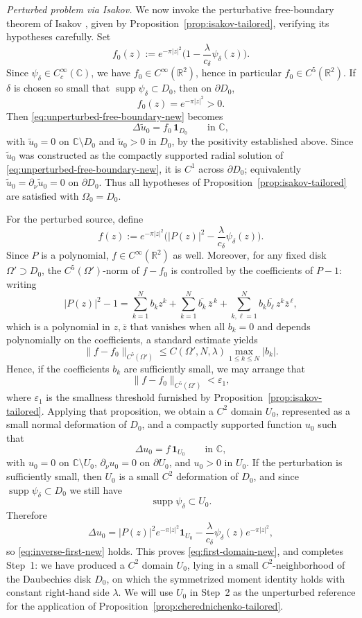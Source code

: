 \documentclass[a4paper,11pt,reqno]{amsart}
\numberwithin{equation}{section}
\theoremstyle{plain} %
\theoremstyle{definition} %
\theoremstyle{remark}
\DeclareMathOperator{\supp}{supp}
\newcommand{\R}{\mathbb{R}}
\newcommand{\C}{\mathbb{C}}
\begin{document}
\smallskip
\emph{Perturbed problem via Isakov.}
We now invoke the perturbative free-boundary theorem of Isakov \cite{Isakov}, given by Proposition~\ref{prop:isakov-tailored}, verifying its hypotheses carefully. Set
\[
f_0(z):=e^{-\pi|z|^2}\Big(1-\frac{\lambda}{c_\delta}\psi_\delta(z)\Big).
\]
Since $\psi_\delta\in C_c^\infty(\C)$, we have $f_0\in C^\infty(\R^2)$, hence in particular $f_0\in C^5(\R^2)$. If $\delta$ is chosen so small that $\supp\psi_\delta\subset D_0$, then on $\partial D_0$,
\[
f_0(z)=e^{-\pi|z|^2}>0.
\]
Then \eqref{eq:unperturbed-free-boundary-new} becomes
\[
\Delta \widetilde u_0=f_0\,\mathbf{1}_{D_0}
\qquad \text{in }\C,
\]
with \(\widetilde u_0=0\) on \(\C\setminus D_0\) and \(\widetilde u_0>0\) in \(D_0\), by the positivity established above. Since \(\widetilde u_0\) was constructed as the compactly supported radial solution of \eqref{eq:unperturbed-free-boundary-new}, it is \(C^1\) across \(\partial D_0\); equivalently \(\widetilde u_0=\partial_\nu \widetilde u_0=0\) on \(\partial D_0\). Thus all hypotheses of Proposition~\ref{prop:isakov-tailored} are satisfied with \(\Omega_0=D_0\).

For the perturbed source, define
\[
f(z):=e^{-\pi|z|^2}\Big(|P(z)|^2-\frac{\lambda}{c_\delta}\psi_\delta(z)\Big).
\]
Since $P$ is a polynomial, $f\in C^\infty(\R^2)$ as well. Moreover, for any fixed disk $\Omega'\supset D_0$, the $C^5(\Omega')$-norm of $f-f_0$ is controlled by the coefficients of $P-1$: writing
\[
|P(z)|^2-1=\sum_{k=1}^N b_k z^k+\sum_{k=1}^N \overline{b_k}\,\overline z^{\,k}+\sum_{k,\ell=1}^N b_k\overline{b_\ell}\,z^k\overline z^{\,\ell},
\]
which is a polynomial in $z,\overline z$ that vanishes when all $b_k=0$ and depends polynomially on the coefficients, a standard estimate yields
\[
\|f-f_0\|_{C^5(\Omega')}\le C(\Omega',N,\lambda)\max_{1\le k\le N}|b_k|.
\]
Hence, if the coefficients $b_k$ are sufficiently small, we may arrange that
\[
\|f-f_0\|_{C^5(\Omega')}<\varepsilon_1,
\]
where $\varepsilon_1$ is the smallness threshold furnished by Proposition~\ref{prop:isakov-tailored}. Applying that proposition, we obtain a \(C^2\) domain \(U_0\), represented as a small normal deformation of \(D_0\), and a compactly supported function \(u_0\) such that
\[
\Delta u_0=f\,\mathbf{1}_{U_0}
\qquad \text{in }\C,
\]
with \(u_0=0\) on \(\C\setminus U_0\), \(\partial_\nu u_0=0\) on \(\partial U_0\), and \(u_0>0\) in \(U_0\).
If the perturbation is sufficiently small, then $U_0$ is a small $C^2$ deformation of $D_0$, and since $\supp\psi_\delta\subset D_0$ we still have
\[
\supp\psi_\delta\subset U_0.
\]
Therefore
\[
\Delta u_0
=
|P(z)|^2e^{-\pi|z|^2}\mathbf{1}_{U_0}
-\frac{\lambda}{c_\delta}\psi_\delta(z)e^{-\pi|z|^2},
\]
so \eqref{eq:inverse-first-new} holds. This proves \eqref{eq:first-domain-new}, and completes Step~1: we have produced a $C^2$ domain $U_0$, lying in a small $C^2$-neighborhood of the Daubechies disk $D_0$, on which the symmetrized moment identity holds with constant right-hand side $\lambda$. We will use $U_0$ in Step~2 as the unperturbed reference for the application of Proposition~\ref{prop:cherednichenko-tailored}.
\end{document}
